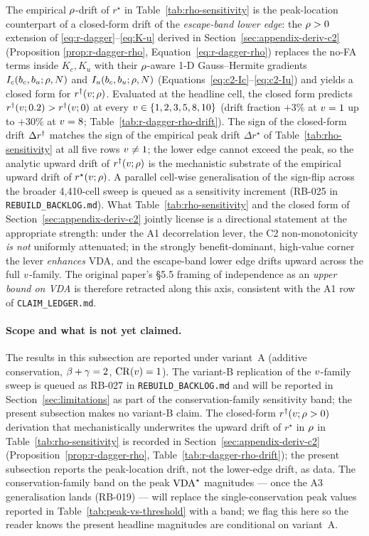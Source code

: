 %
The empirical $\rho$-drift of $r^\star$ in
Table~\ref{tab:rho-sensitivity} is the peak-location counterpart
of a closed-form drift of the \emph{escape-band lower edge}: the
$\rho > 0$ extension of \eqref{eq:r-dagger}--\eqref{eq:K-u}
derived in Section~\ref{sec:appendix-deriv-c2} (Proposition
\ref{prop:r-dagger-rho}, Equation~\eqref{eq:r-dagger-rho}) replaces
the no-FA terms inside $K_c, K_u$ with their $\rho$-aware 1-D
Gauss--Hermite gradients $I_c(b_c, b_u; \rho, N)$ and
$I_u(b_c, b_u; \rho, N)$ (Equations~\eqref{eq:c2-Ic}--\eqref{eq:c2-Iu})
and yields a closed form for $r^{\dagger}(v; \rho)$. Evaluated at
the headline cell, the closed form predicts $r^{\dagger}(v;0.2) >
r^{\dagger}(v;0)$ at every $v \in \{1, 2, 3, 5, 8, 10\}$ (drift
fraction $+3\%$ at $v = 1$ up to $+30\%$ at $v = 8$;
Table~\ref{tab:r-dagger-rho-drift}). The sign of the closed-form
drift $\Delta r^{\dagger}$ matches the sign of the empirical peak drift
$\Delta r^\star$ of Table~\ref{tab:rho-sensitivity} at all five rows
$v \ne 1$; the lower edge cannot exceed the peak, so the
analytic upward drift of $r^{\dagger}(v;\rho)$ is the
mechanistic substrate of the empirical upward drift of
$r^\star(v;\rho)$. A parallel cell-wise generalisation of the
sign-flip across the broader 4,410-cell sweep is queued as a
sensitivity increment (RB-025 in \texttt{REBUILD\_BACKLOG.md}).
What Table~\ref{tab:rho-sensitivity} and the closed form of
Section~\ref{sec:appendix-deriv-c2} jointly license is a
directional statement at the appropriate strength: under the A1
decorrelation lever, the C2 non-monotonicity \emph{is not}
uniformly attenuated; in the strongly benefit-dominant, high-value
corner the lever \emph{enhances} VDA, and the
escape-band lower edge drifts upward across the full $v$-family.
The original paper's §5.5 framing of independence as an
\emph{upper bound on VDA} is therefore retracted along this axis,
consistent with the A1 row of \texttt{CLAIM\_LEDGER.md}.

\paragraph{Scope and what is not yet claimed.}
The results in this subsection are reported under variant~A
(additive conservation, $\beta + \gamma = 2$,
$\mathrm{CR}(v) = 1$). The variant-B replication of the $v$-family
sweep is queued as RB-027 in \texttt{REBUILD\_BACKLOG.md} and will
be reported in Section~\ref{sec:limitations} as part of the
conservation-family sensitivity band; the present subsection makes
no variant-B claim. The closed-form $r^{\dagger}(v; \rho > 0)$
derivation that mechanistically underwrites the upward drift of
$r^\star$ in $\rho$ in Table~\ref{tab:rho-sensitivity} is recorded
in Section~\ref{sec:appendix-deriv-c2}
(Proposition~\ref{prop:r-dagger-rho},
Table~\ref{tab:r-dagger-rho-drift}); the present subsection
reports the peak-location drift, not the lower-edge drift, as
data.
The conservation-family band on the peak $\mathrm{VDA}^\star$ magnitudes ---
once the A3 generalisation lands (RB-019) --- will replace the
single-conservation peak values reported in
Table~\ref{tab:peak-vs-threshold} with a band; we flag this here so
the reader knows the present headline magnitudes are conditional on
variant~A.

